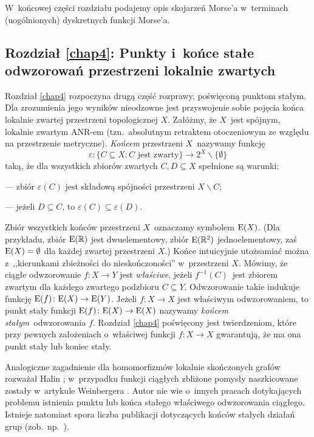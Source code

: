 W~końcowej części rozdziału podajemy opis skojarzeń Morse'a w~terminach (uogólnionych) dyskretnych funkcji Morse'a.


\subsection*{Rozdział \ref{chap4}: Punkty i~końce stałe odwzorowań przestrzeni lokalnie zwartych}
Rozdział \ref{chap4} rozpoczyna drugą część rozprawy, poświęconą punktom stałym. Dla zrozumienia jego wyników nieodzowne jest przyswojenie sobie pojęcia końca lokalnie zwartej przestrzeni topologicznej $X$. Załóżmy, że $X$~jest spójnym, lokalnie zwartym ANR-em (tzn.~absolutnym retraktem otoczeniowym ze względu na przestrzenie metryczne). \textit{Końcem} \cite{Milnor68} przestrzeni $X$~nazywamy funkcję \[\varepsilon\colon \{C\subseteq X:C\text{ jest zwarty}\}\to 2^X\smallsetminus \{\emptyset\}\] taką, że dla wszystkich zbiorów zwartych $C,D\subseteq X$ spełnione są warunki:
\begin{compactitem}
\item[---] zbiór $\varepsilon(C)$ jest składową spójności przestrzeni $X\smallsetminus C$;
\item[---] jeżeli $D\subseteq C$, to $\varepsilon(C)\subseteq \varepsilon(D)$.
\end{compactitem}
Zbiór wszystkich końców przestrzeni $X$~oznaczamy symbolem $\mathrm{E}(X)$. (Dla przykładu, zbiór $\mathrm{E}(\mathbb{R})$ jest dwuelementowy, zbiór $\mathrm{E}(\mathbb{R}^2)$ jednoelementowy, zaś $\mathrm{E}(X)=\emptyset$ dla każdej zwartej przestrzeni $X$.) Końce intuicyjnie utożsamiać można z~,,kierunkami zbieżności do nieskończoności'' w~przestrzeni $X$. Mówimy, że ciągłe odwzorowanie $f\colon X\to Y$ jest \textit{właściwe}, jeżeli $f^{-1}(C)$~jest zbiorem zwartym dla każdego zwartego podzbioru $C\subseteq Y$. Odwzorowanie takie indukuje funkcję $\mathrm{E}(f)\colon \mathrm{E}(X)\to \mathrm{E}(Y)$. Jeżeli $f\colon X\to X$ jest właściwym odwzorowaniem, to punkt stały funkcji $\mathrm{E}(f)\colon \mathrm{E}(X)\to \mathrm{E}(X)$ nazywamy \textit{końcem stałym}~odwzorowania $f$. Rozdział \ref{chap4} poświęcony jest twierdzeniom, które przy pewnych założeniach o~właściwej funkcji $f\colon X\to X$ gwarantują, że ma ona punkt stały lub koniec stały.

Analogiczne zagadnienie dla homomorfizmów lokalnie skończonych grafów rozważał Halin \cite{Halin73}; w~przypadku funkcji ciągłych zbliżone pomysły naszkicowane zostały w~artykule Weinbergera \cite{Weinberger09}. Autor nie wie o~innych pracach dotykających problemu istnienia punktu lub końca stałego właściwego odwzorowania ciągłego. Istnieje natomiast spora liczba publikacji dotyczących końców stałych działań grup (zob.~np.~\cite{Hamann11,Moller95}).

